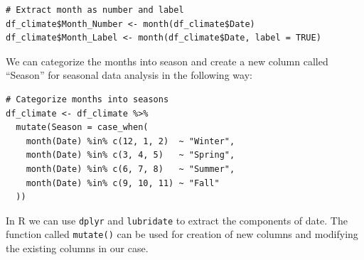 \begin{verbatim}
# Extract month as number and label
df_climate$Month_Number <- month(df_climate$Date)     
df_climate$Month_Label <- month(df_climate$Date, label = TRUE)
\end{verbatim}

We can categorize the months into season and create a new column called “Season” for seasonal data analysis in the following way:

\begin{verbatim}
# Categorize months into seasons
df_climate <- df_climate %>%
  mutate(Season = case_when(
    month(Date) %in% c(12, 1, 2)  ~ "Winter",
    month(Date) %in% c(3, 4, 5)   ~ "Spring",
    month(Date) %in% c(6, 7, 8)   ~ "Summer",
    month(Date) %in% c(9, 10, 11) ~ "Fall"
  ))
\end{verbatim}

In R we can use \texttt{dplyr} and \texttt{lubridate} to extract the components of date. The function called \texttt{mutate()} can be used for creation of new columns and modifying the existing columns in our case.

